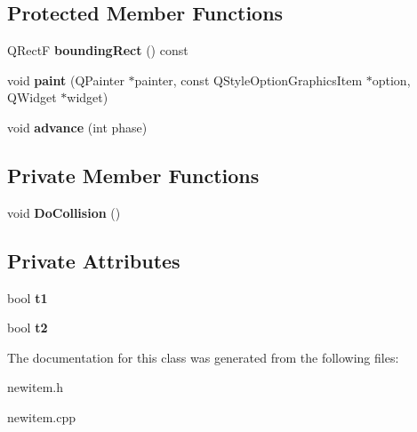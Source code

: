 \subsection*{Protected Member Functions}
\begin{DoxyCompactItemize}
\item 
\hypertarget{classnew_item_a428251763990e1edf93750f5e922bb2d}{Q\-Rect\-F {\bfseries bounding\-Rect} () const }\label{classnew_item_a428251763990e1edf93750f5e922bb2d}

\item 
\hypertarget{classnew_item_a9df6da5f0b895d1b5d302ce6b7d153bf}{void {\bfseries paint} (Q\-Painter $\ast$painter, const Q\-Style\-Option\-Graphics\-Item $\ast$option, Q\-Widget $\ast$widget)}\label{classnew_item_a9df6da5f0b895d1b5d302ce6b7d153bf}

\item 
\hypertarget{classnew_item_a2da73b26c37070ae64179a45d2fa2f47}{void {\bfseries advance} (int phase)}\label{classnew_item_a2da73b26c37070ae64179a45d2fa2f47}

\end{DoxyCompactItemize}
\subsection*{Private Member Functions}
\begin{DoxyCompactItemize}
\item 
\hypertarget{classnew_item_ac407f5957e6915ba6333ffe03ce0380b}{void {\bfseries Do\-Collision} ()}\label{classnew_item_ac407f5957e6915ba6333ffe03ce0380b}

\end{DoxyCompactItemize}
\subsection*{Private Attributes}
\begin{DoxyCompactItemize}
\item 
\hypertarget{classnew_item_ab37ba167860f718c7c9b0f6889a5c10c}{bool {\bfseries t1}}\label{classnew_item_ab37ba167860f718c7c9b0f6889a5c10c}

\item 
\hypertarget{classnew_item_a850febe1d828ad871e3cd1376e26830c}{bool {\bfseries t2}}\label{classnew_item_a850febe1d828ad871e3cd1376e26830c}

\end{DoxyCompactItemize}


The documentation for this class was generated from the following files\-:\begin{DoxyCompactItemize}
\item 
newitem.\-h\item 
newitem.\-cpp\end{DoxyCompactItemize}
